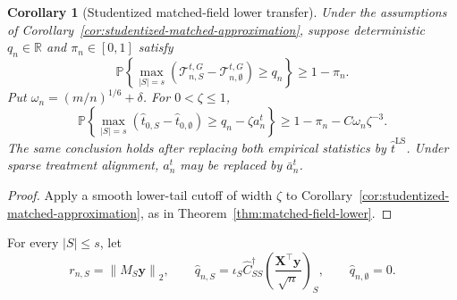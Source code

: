 \documentclass[a4paper,11pt,english]{article}
\newtheorem{corollary}[theorem]{Corollary}
\newcommand{\Prob}{\mathbb P}
\newcommand{\norm}[1]{\left\lVert #1\right\rVert}
\newcommand{\R}{\mathbb R}
\begin{document}
\begin{corollary}[Studentized matched-field lower transfer]
\label{cor:studentized-matched-lower}
Under the assumptions of
Corollary~\ref{cor:studentized-matched-approximation}, suppose
deterministic $q_n\in\R$ and $\pi_n\in[0,1]$ satisfy
\begin{equation*}
 \Prob\left\{
 \max_{|S|=s}(\mathcal T^{t,G}_{n,S}
 -\mathcal T^{t,G}_{n,\emptyset})\ge q_n
 \right\}\ge1-\pi_n.
\end{equation*}
Put $\omega_n=(m/n)^{1/6}+\delta$.  For $0<\zeta\le1$,
\begin{equation}\label{eq:studentized-matched-lower-transfer}
 \Prob\left\{
 \max_{|S|=s}(\hat t_{0,S}-\hat t_{0,\emptyset})
 \ge q_n-\zeta a_n^t
 \right\}
 \ge1-\pi_n-C\omega_n\zeta^{-3}.
\end{equation}
The same conclusion holds after replacing both empirical statistics by
$\hat t^{\mathrm{LS}}$.  Under sparse treatment alignment, $a_n^t$ may
be replaced by $\bar a_n^t$.
\end{corollary}

\begin{proof}
Apply a smooth lower-tail cutoff of width $\zeta$ to
Corollary~\ref{cor:studentized-matched-approximation}, as in
Theorem~\ref{thm:matched-field-lower}.
\end{proof}

For every $|S|\le s$, let
\begin{equation*}
 r_{n,S}=\norm{M_S\mathbf y}_2,
 \qquad
 \hat q_{n,S}
 =\iota_S\hat C_{SS}^{\dagger}
 \left(\frac{\mathbf X^\top\mathbf y}{\sqrt n}\right)_S,
 \qquad
 \hat q_{n,\emptyset}=0.
\end{equation*}
\end{document}
